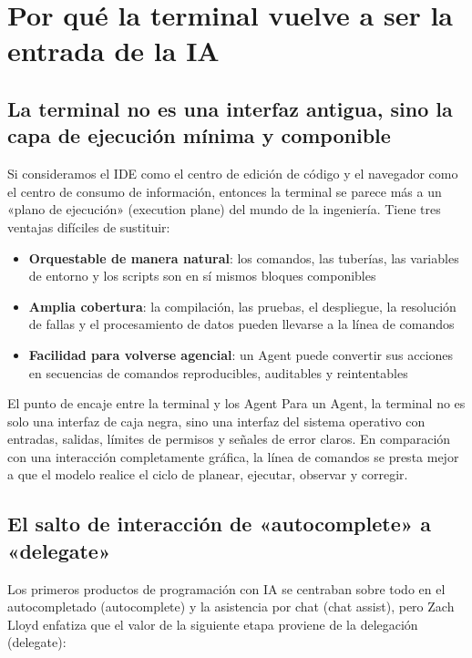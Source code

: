 \section{Por qué la terminal vuelve a ser la entrada de la IA}

\subsection{La terminal no es una interfaz antigua, sino la capa de ejecución mínima y componible}

Si consideramos el IDE como el centro de edición de código y el navegador como el centro de consumo de información, entonces la terminal se parece más a un «plano de ejecución» (execution plane) del mundo de la ingeniería. Tiene tres ventajas difíciles de sustituir:

\begin{itemize}
    \item \textbf{Orquestable de manera natural}: los comandos, las tuberías, las variables de entorno y los scripts son en sí mismos bloques componibles
    \item \textbf{Amplia cobertura}: la compilación, las pruebas, el despliegue, la resolución de fallas y el procesamiento de datos pueden llevarse a la línea de comandos
    \item \textbf{Facilidad para volverse agencial}: un Agent puede convertir sus acciones en secuencias de comandos reproducibles, auditables y reintentables
\end{itemize}

\begin{knowledgebox}{El punto de encaje entre la terminal y los Agent}
Para un Agent, la terminal no es solo una interfaz de caja negra, sino una interfaz del sistema operativo con entradas, salidas, límites de permisos y señales de error claros. En comparación con una interacción completamente gráfica, la línea de comandos se presta mejor a que el modelo realice el ciclo de planear, ejecutar, observar y corregir.
\end{knowledgebox}

\subsection{El salto de interacción de «autocomplete» a «delegate»}

Los primeros productos de programación con IA se centraban sobre todo en el autocompletado (autocomplete) y la asistencia por chat (chat assist), pero Zach Lloyd enfatiza que el valor de la siguiente etapa proviene de la delegación (delegate):

